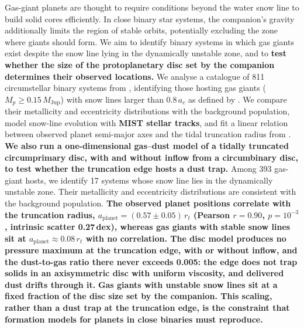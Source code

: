 \documentclass{aa}
\newcommand{\rev}[1]{{\color{red}\textbf{#1}}}
\begin{document}
   \abstract
   {Gas-giant planets are thought to require conditions beyond the water
    snow line to build solid cores efficiently. In close binary star
    systems, the companion's gravity additionally limits the region of
    stable orbits, potentially excluding the zone where giants should form.}
   {We aim to identify binary systems in which gas giants exist despite
    the snow line lying in the dynamically unstable zone, and to \rev{test
    whether the size of the protoplanetary disc set by the companion
    determines their observed locations.}}
   {We analyse a catalogue of 811 circumstellar binary systems from
    \citet{Thebault2025}, identifying those hosting gas giants
    ($M_p \geq 0.15\,M_\mathrm{Jup}$) with snow lines larger than
    $0.8\,a_c$ as defined by \citet{Quarles_2020}. We compare their
    metallicity and eccentricity distributions with the background
    population, model snow-line evolution with \rev{MIST stellar tracks}, and fit a linear
    relation between observed planet semi-major axes and the tidal
    truncation radius from \citet{Pichardo2005}. \rev{We also run a
    one-dimensional gas--dust model of a tidally truncated circumprimary
    disc, with and without inflow from a circumbinary disc, to test
    whether the truncation edge hosts a dust trap.}}
   {Among 393 gas-giant hosts, we identify 17 systems whose snow line
    lies in the dynamically unstable zone. Their metallicity and
    eccentricity distributions are consistent with the background
    population. \rev{The observed planet positions correlate with the
    truncation radius, $a_\mathrm{planet} = (0.57 \pm 0.05)\,r_t$
    (Pearson $r = 0.90$, $p = 10^{-3}$, intrinsic scatter 0.27\,dex),
    whereas gas giants with stable snow lines sit at
    $a_\mathrm{planet} \approx 0.08\,r_t$ with no correlation. The disc
    model produces no pressure maximum at the truncation edge, with or
    without inflow, and the dust-to-gas ratio there never exceeds 0.005:
    the edge does not trap solids in an axisymmetric disc with uniform
    viscosity, and delivered
    dust drifts through it.}}
   {\rev{Gas giants with unstable snow lines sit at a fixed fraction of
    the disc size set by the companion. This scaling, rather than a dust
    trap at the truncation edge, is the constraint that formation models
    for planets in close binaries must reproduce.}}

\end{document}
